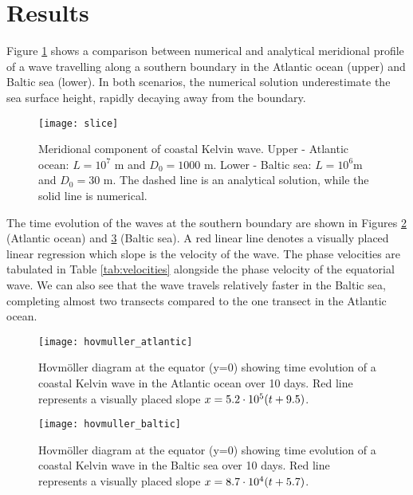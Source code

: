 \section{Results}
\label{sec:results}

Figure \ref{fig:atlanticbaltic} shows a comparison between numerical and analytical meridional profile of a wave travelling along a southern boundary in the Atlantic ocean (upper) and Baltic sea (lower). In both scenarios, the numerical solution underestimate the sea surface height, rapidly decaying away from the boundary.
	\begin{figure}[htbp]
		\centering
		\texttt{[image: slice]}
		\caption{Meridional component of coastal Kelvin wave. Upper - Atlantic ocean: $ L=10^7 $ m and $D_0 = 1000$ m. Lower - Baltic sea: $ L = 10^6 $m and $ D_0 = 30 $ m. The dashed line is an analytical solution, while the solid line is numerical.}
		\label{fig:atlanticbaltic}
	\end{figure}

The time evolution of the waves at the southern boundary are shown in Figures \ref{fig:atlantic} (Atlantic ocean) and \ref{fig:baltic} (Baltic sea). A red linear line denotes a visually placed linear regression which slope is the velocity of the wave. The phase velocities are tabulated in Table \ref{tab:velocities} alongside the phase velocity of the equatorial wave. We can also see that the wave travels relatively faster in the Baltic sea, completing almost two transects compared to the one transect in the Atlantic ocean.
	\begin{figure}[htbp]
		\centering
		\texttt{[image: hovmuller\_atlantic]}
		\caption{Hovmöller diagram at the equator (y=0) showing time evolution of a coastal Kelvin wave in the Atlantic ocean over 10 days. Red line represents a visually placed slope $x = 5.2 \cdot 10^5 \qty(t + 9.5)$.}
		\label{fig:atlantic}
	\end{figure}

	\begin{figure}[htbp]
		\centering
		\texttt{[image: hovmuller\_baltic]}
		\caption{Hovmöller diagram at the equator (y=0) showing time evolution of a coastal Kelvin wave in the Baltic sea over 10 days. Red line represents a visually placed slope $x = 8.7 \cdot 10^4\qty(t + 5.7)$.}
		\label{fig:baltic}
	\end{figure}

